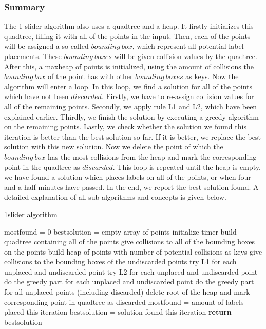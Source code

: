 \documentclass[crop=false,a4paper,oneside,11pt]{article}
\begin{document}
\subsubsection{Summary}
The 1-slider algorithm also uses a quadtree and a heap. It firstly initializes this quadtree, filling it with all of the points in the input. Then, each of the points will be assigned a so-called $bounding\ box$, which represent all potential label placements. These $bounding \ boxes$ will be given collision values by the quadtree. After this, a maxheap of points is initialized, using the amount of collisions the $bounding \ box$ of the point has with other $bounding \ boxes$ as keys. Now the algorithm will enter a loop. In this loop, we find a solution for all of the points which have not been $discarded$. Firstly, we have to re-assign collision values for all of the remaining points. Secondly, we apply rule L1 and L2, which have been explained earlier. Thirdly, we finish the solution by executing a greedy algorithm on the remaining points. Lastly, we check whether the solution we found this iteration is better than the best solution so far. If it is better, we replace the best solution with this new solution. Now we delete the point of which the $bounding \ box$ has the most collisions from the heap and mark the corresponding point in the quadtree as $discarded$. This loop is repeated until the heap is empty, we have found a solution which places labels on all of the points, or when four and a half minutes have passed. In the end, we report the best solution found. A detailed explanation of all sub-algorithms and concepts is given below. \\
 \begin{algorithm}[H]
\caption{1slider algorithm}
\begin{algorithmic}[1]
\State mostfound = 0
\State bestsolution = empty array of points
\State initialize timer
\State build quadtree containing all of the points
\State give collisions to all of the bounding boxes on the points
\State build heap of points with number of potential collisions as keys
\State give collisions to the bounding boxes of the undiscarded points
\State try L1 for each unplaced and undiscarded point
\State try L2 for each unplaced and undiscarded point
\State do the greedy part for each unplaced and undiscarded point
\State do the greedy part for all unplaced points (including discarded)
\State delete root of the heap and mark corresponding point in quadtree as discarded
\State mostfound = amount of labels placed this iteration
\State bestsolution = solution found this iteration
\EndIf
\EndWhile
\State \textbf{return} bestsolution
\EndProcedure
\end{algorithmic}
\end{algorithm}
\end{document}
